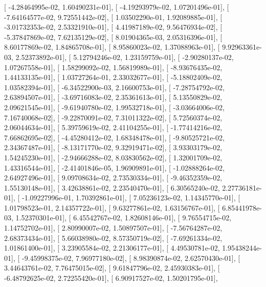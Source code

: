 \documentclass{article}
\begin{document}
       [ -4.28464995e-02,   1.60490231e-01],
       [ -4.19293979e-02,   1.07201496e-01],
       [ -7.64164577e-02,   9.72551442e-02],
       [  1.03502290e-01,   1.92089885e-01],
       [ -3.01732353e-02,   2.53321910e-01],
       [  4.41987189e-02,   9.56476934e-02],
       [ -5.37847869e-02,   7.62135129e-02],
       [  8.01904365e-03,   2.05316396e-01],
       [  8.60177869e-02,   1.84865708e-01],
       [  8.95860023e-02,   1.37088963e-01],
       [  9.92963361e-03,   2.52373892e-01],
       [  5.12794246e-02,   1.23159759e-01],
       [ -2.90280137e-02,   1.07267558e-01],
       [  1.58299092e-02,   1.56819989e-01],
       [ -8.93676435e-02,   1.44133135e-01],
       [  1.03727264e-01,   2.33032677e-01],
       [ -5.18802409e-02,   1.03582394e-01],
       [ -6.34522900e-03,   2.16600753e-01],
       [ -7.28754792e-02,   2.63894507e-01],
       [ -3.69716083e-02,   2.35361613e-01],
       [  5.13550829e-02,   2.09621545e-01],
       [ -9.61940780e-02,   1.99532718e-01],
       [ -3.03664006e-02,   7.16740068e-02],
       [ -9.22870091e-02,   7.31011322e-02],
       [  5.72560374e-02,   2.06044634e-01],
       [  5.39759619e-02,   2.41104255e-01],
       [ -1.77414216e-02,   7.66862695e-02],
       [ -4.45280412e-02,   1.68348478e-01],
       [ -9.80525721e-02,   2.34367487e-01],
       [ -8.13171770e-02,   9.32919471e-02],
       [  3.93303179e-02,   1.54245230e-01],
       [ -2.94666288e-02,   8.03830562e-02],
       [  1.32001709e-02,   1.43316544e-01],
       [ -2.41401846e-05,   1.96909891e-01],
       [ -1.02888264e-02,   2.64927496e-01],
       [  9.09708634e-02,   2.73530334e-01],
       [ -9.46352359e-02,   1.55130148e-01],
       [  3.42638861e-02,   2.23540470e-01],
       [  6.30565240e-02,   2.27736181e-01],
       [ -1.09227996e-01,   1.70392861e-01],
       [  7.05236123e-02,   1.14345770e-01],
       [  1.01798523e-01,   2.14357722e-01],
       [  9.63277861e-02,   1.63156767e-01],
       [  6.85441978e-03,   1.52370301e-01],
       [  6.45542767e-02,   1.82608146e-01],
       [  9.76554715e-02,   1.14752702e-01],
       [  2.80990007e-02,   1.50897507e-01],
       [ -7.56764287e-02,   2.68373434e-01],
       [  5.66038980e-02,   8.57350719e-02],
       [ -7.69261334e-02,   1.01861400e-01],
       [  3.23905584e-02,   2.21306177e-01],
       [  4.49530781e-02,   1.95438244e-01],
       [ -9.45998375e-02,   7.96977180e-02],
       [  8.98390874e-02,   2.62570430e-01],
       [  3.44643761e-02,   7.76475015e-02],
       [  9.61847796e-02,   2.45930383e-01],
       [ -6.48792625e-02,   2.72255420e-01],
       [  6.90917527e-02,   1.50201795e-01],
\end{document}
